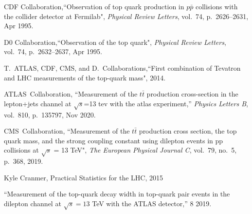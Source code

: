 \documentclass[12pt]{article}
\begin{document}
\begin{thebibliography}{99}



CDF Collaboration,``Observation of top quark production in $p\bar{p}$ collisions with the collider detector at Fermilab", {\em Physical Review Letters}, vol.~74, p.~2626–2631, Apr 1995.

D0 Collaboration,``Observation of the top quark", {\em Physical Review Letters}, vol.~74, p.~2632–2637, Apr 1995.

T.~ATLAS, CDF, CMS, and D.~Collaborations,``First combination of Tevatron and LHC measurements of the top-quark mass", 2014.

ATLAS~Collaboration, ``Measurement of the $t\bar{t}$ production cross-section in the lepton+jets channel at $\sqrt{s}$=13 tev with the atlas experiment,''
  {\em Physics Letters B}, vol.~810, p.~135797, Nov 2020.

CMS~Collaboration, ``Measurement of the $t\bar{t}$ production cross section, the top quark mass, and the strong coupling constant using dilepton events in pp collisions
  at $\sqrt{s}$ = 13 TeV", {\em The European
  Physical Journal C}, vol.~79, no.~5, p.~368, 2019.

Kyle Cranmer, Practical Statistics for the LHC, 2015

``{Measurement of the top-quark decay width in top-quark pair events in the
  dilepton channel at $\sqrt{s}=13$ TeV with the ATLAS detector},'' 8 2019.


\end{thebibliography}

 
\end{document}
